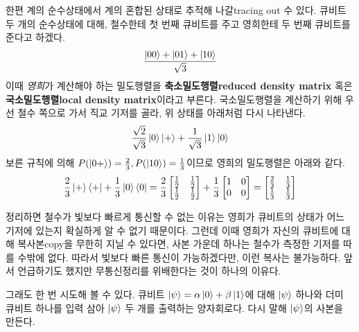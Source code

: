 \documentclass[a4paper,chapter,atbegshi]{oblivoir}
\begin{document}
한편 계의 순수상태에서 계의 혼합된 상태로 추적해 나갈{\tiny tracing out} 수
있다.  큐비트 두 개의 순수상태에 대해, 철수한테 첫 번째 큐비트를
주고 영희한테 두 번째 큐비트를 준다고 하겠다.
\[
  \frac{\ket{00}+\ket{01}+\ket{10}}{\sqrt3}
\]
이때 \emph{영희}가 계산해야 하는 밀도행렬을 \textbf{축소밀도행렬\tiny reduced density
matrix} 혹은 \textbf{국소밀도행렬\tiny local density matrix}이라고 부른다.
국소밀도행렬을 계산하기 위해 우선 철수 쪽으로 가서 직교 기저를 골라,
위 상태를 아래처럼 다시 나타낸다.
\[
  \frac{\sqrt2}{\sqrt3}\ket0\ket++\frac{1}{\sqrt3}\ket1\ket0
\]
보른 규칙에 의해 $P(\ket{0+})=\frac{2}{3}, P(\ket{10})=\frac{1}{3}$이므로
영희의 밀도행렬은 아래와 같다.
\[
  \frac{2}{3}\ket+\bra++\frac{1}{3}\ket0\bra0=\frac{2}{3}\begin{bmatrix}
  \frac{1}{2} &\frac{1}{2} \\ \frac{1}{2} &\frac{1}{2}\end{bmatrix}+
  \frac{1}{3}\begin{bmatrix}1&0\\0&0\end{bmatrix}=
  \begin{bmatrix}\frac{2}{3} &\frac{1}{3} \\ \frac{1}{3} &\frac{1}{3}\end{bmatrix}
\]

정리하면 철수가 빛보다 빠르게 통신할 수 없는 이유는 영희가 큐비트의 상태가
어느 기저에 있는지 확실하게 알 수 없기 때문이다. 그런데 이때 영희가 자신의
큐비트에 대해 복사본{\tiny copy}을 무한히 지닐 수 있다면, 사본 가운데 하나는
철수가 측정한 기저를 따를 수밖에 없다. 따라서 빛보다 빠른 통신이 가능하겠다만, 
이런 복사는 불가능하다. 앞서 언급하기도 했지만 무통신정리를 위배한다는
것이 하나의 이유다. 

그래도 한 번 시도해 볼 수 있다. 큐비트 $\ket{\psi}=\alpha\ket0+\beta\ket1$에
대해 $\ket{\psi}$ 하나와 더미 큐비트 하나를 입력 삼아 
$\ket{\psi}$ 두 개를 출력하는 양자회로다. 다시 말해 $\ket{\psi}$의 사본을 만든다.
\end{document}
